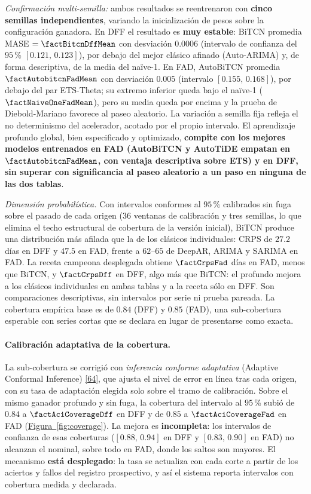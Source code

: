 \documentclass[12pt,letterpaper]{report}
\newcommand{\cita}[1]{\hyperref[bib:#1]{[#1]}}
\begin{document}
\textit{Confirmación multi-semilla:} ambos resultados se reentrenaron con \textbf{cinco semillas
independientes}, variando la inicialización de pesos sobre la configuración ganadora. En DFF el
resultado es \textbf{muy estable}: BiTCN promedia MASE $=\factBitcnDffMean$ con desviación
$0.0006$ (intervalo de confianza del $95$\,\% $[0.121,\,0.123]$), por debajo del mejor clásico
afinado (Auto-ARIMA) y, de forma descriptiva, de la media del naïve-1. En FAD, AutoBiTCN
promedia $\factAutobitcnFadMean$ con desviación $0.005$ (intervalo $[0.155,\,0.168]$), por debajo
del par ETS-Theta; su extremo inferior queda bajo el naïve-1 ($\factNaiveOneFadMean$), pero su
media queda por encima y la prueba de Diebold-Mariano favorece al paseo aleatorio. La variación
a semilla fija refleja el no determinismo del acelerador, acotado por el propio intervalo. El
aprendizaje profundo global, bien especificado y optimizado, \textbf{compite con los mejores
modelos entrenados en FAD (AutoBiTCN y AutoTiDE empatan en $\factAutobitcnFadMean$, con ventaja
descriptiva sobre ETS) y en DFF, sin superar con significancia al paseo aleatorio a un paso en
ninguna de las dos tablas}.

\textit{Dimensión probabilística.} Con intervalos conformes al $95$\,\% calibrados sin fuga
sobre el pasado de cada origen (36 ventanas de calibración y tres semillas, lo que elimina el
techo estructural de cobertura de la versión inicial), BiTCN produce una distribución más
afilada que la de los clásicos individuales: CRPS de $27.2$ días en DFF y $47.5$ en FAD, frente
a $62$--$65$ de DeepAR, ARIMA y SARIMA en FAD. La receta campeona desplegada obtiene
$\factCrpsFad$ días en FAD, menos que BiTCN, y $\factCrpsDff$ en DFF, algo más que BiTCN: el
profundo mejora a los clásicos individuales en ambas tablas y a la receta sólo en DFF. Son comparaciones descriptivas, sin intervalos por serie
ni prueba pareada. La cobertura empírica base es de $0.84$ (DFF) y $0.85$ (FAD), una sub-cobertura
esperable con series cortas que se declara en lugar de presentarse como exacta.

\paragraph{Calibración adaptativa de la cobertura.} La sub-cobertura se corrigió con
\textit{inferencia conforme adaptativa} (Adaptive Conformal Inference) \cita{64}, que ajusta el
nivel de error en línea tras cada origen, con su tasa de adaptación elegida solo sobre el tramo
de calibración. Sobre el mismo ganador profundo y sin fuga, la cobertura del intervalo al
$95$\,\% subió de $0.84$ a $\factAciCoverageDff$ en DFF y de $0.85$ a $\factAciCoverageFad$ en
FAD (\hyperref[fig:coverage]{Figura~\ref*{fig:coverage}}). La mejora es \textbf{incompleta}: los intervalos de confianza de
esas coberturas ($[0.88,\,0.94]$ en DFF y $[0.83,\,0.90]$ en FAD) no alcanzan el nominal, sobre
todo en FAD, donde los saltos son mayores. El mecanismo \textbf{está desplegado}: la tasa se
actualiza con cada corte a partir de los aciertos y fallos del registro prospectivo, y así el
sistema reporta intervalos con cobertura medida y declarada.
\end{document}
